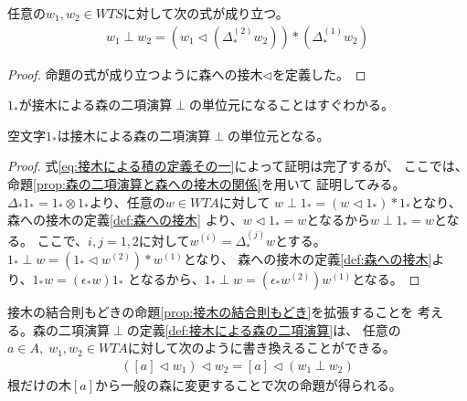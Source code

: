 	\begin{proposition}[森の二項演算と森への接木の関係]\label{prop:森の二項演算と森への接木の関係} %
		任意の$w_1,w_2\in WTS$に対して次の式が成り立つ。
		\begin{equation}\begin{split} %
			w_1\perp w_2 
			= \left(w_1\lhd(\Delta_*^{(2)}w_2)\right)*(\Delta_*^{(1)}w_2)
		\end{split}\end{equation} %
	\end{proposition} %
	\begin{proof} %
		命題の式が成り立つように森への接木$\lhd$を定義した。
	\end{proof} %

	$1_*$が接木による森の二項演算$\perp$の単位元になることはすぐわかる。

	\begin{proposition}[接木による森の二項演算の単位元]\label{prop:接木による森の二項演算の単位元} %
		空文字$1_*$は接木による森の二項演算$\perp$の単位元となる。
	\end{proposition} %
	\begin{proof} %
		式\eqref{eq:接木による積の定義その一}によって証明は完了するが、
		ここでは、命題\ref{prop:森の二項演算と森への接木の関係}を用いて
		証明してみる。
		$\Delta_*1_*=1_*\otimes 1_*$より、任意の$w\in WTA$に対して
		$w\perp1_*=(w\lhd1_*)*1_*$となり、森への接木の定義\ref{def:森への接木}
		より、$w\lhd1_*=w$となるから$w\perp1_*=w$となる。
		ここで、$i,j=1,2$に対して$w^{(i)}=\Delta_*^{(j)}w$とする。
		$1_*\perp w=(1_*\lhd w^{(2)})*w^{(1)}$となり、
		森への接木の定義\ref{def:森への接木}より、$1_*w=(\epsilon_*w)1_*$
		となるから、$1_*\perp w=(\epsilon_*w^{(2)})w^{(1)}$となる。
	\end{proof} %

	接木の結合則もどきの命題\ref{prop:接木の結合則もどき}を拡張することを
	考える。森の二項演算$\perp$の定義\ref{def:接木による森の二項演算}は、
	任意の$a\in A,\;w_1,w_2\in WTA$に対して次のように書き換えることができる。
	\begin{equation*}\begin{split} %
		([a]\lhd w_1)\lhd w_2 = [a]\lhd(w_1\perp w_2)
	\end{split}\end{equation*} %
	根だけの木$[a]$から一般の森に変更することで次の命題が得られる。

